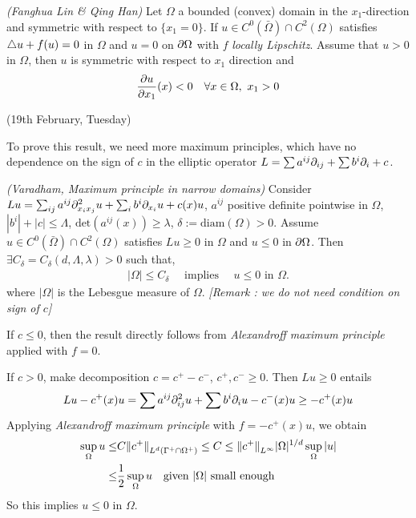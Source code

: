 \documentclass[12pt,a4paper]{article}
\newenvironment{proof}
{\begin{changemargin}{1cm}{0.5cm} 
	}%
	{\end{changemargin}
}
\newenvironment{p}
{\begin{proof} 
	}%
	{\end{proof}
}
\begin{document}
\lem \emph{(Fanghua Lin \& Qing Han)} Let $\Omega$ a bounded (convex) domain in the $x_1$-direction and symmetric with respect to $\{x_1 =0 \}$. If $u\in C^0(\bar{\Omega}) \cap C^2(\Omega)$ satisfies $\triangle u + f(u) =0$ in $\Omega$ and $u =0$ on $\partial \Omega$ with $f$ \emph{locally Lipschitz}. Assume that $u>0$ in $\Omega$, then $u$ is symmetric with respect to $x_1$ direction and
\begin{align*}
\frac{\partial u}{\partial x_1}(x) < 0 \quad \forall x\in \Omega, \,\, x_1>0
\end{align*}
\s

\newday

(19th February, Tuesday)
\s

To prove this result, we need more maximum principles, which have no dependence on the sign of $c$ in the elliptic operator $L = \sum a^{ij} \partial_{ij} + \sum b^i \partial_i + c$.
\s

\thm \emph{(Varadham, Maximum principle in narrow domains)} Consider $Lu = \sum_{ij}a^{ij} \partial^2_{x_i x_j} u + \sum_i b^i \partial_{x_i} u + c(x) u$, $a^{ij}$ positive definite pointwise in $\Omega$, $|b^i| + |c| \leq \Lambda$, $\text{det}(a^{ij}(x)) \geq \lambda$, $\delta := \text{diam}(\Omega)>0$. Assume $u \in C^0(\bar{\Omega}) \cap C^2(\Omega)$ satisfies $Lu \geq 0$ in $\Omega$ and $u\leq 0$ in $\partial \Omega$. Then $\exists C_{\delta} = C_{\delta}(d, \Lambda, \lambda) >0$ such that,
\begin{align*}
|\Omega|\leq C_{\delta} \quad \text{ implies } \quad u\leq 0\,\, \text{in } \Omega.
\end{align*}
where $|\Omega|$ is the Lebesgue measure of $\Omega$.
\emph{[Remark : we do not need condition on sign of $c$]}
\begin{p}
\pf If $c\leq 0$, then the result directly follows from \emph{Alexandroff maximum principle} applied with $f=0$.
\s

If $c>0$, make decomposition $c= c^+ - c^-$, $c^+, c^- \geq 0$. Then $Lu \geq 0$ entails
\begin{align*}
Lu - c^+(x)u = \sum a^{ij} \partial^2_{ij} u + \sum b^i \partial_i u - c^-(x) u  \geq -c^+(x) u
\end{align*}
Applying \emph{Alexandroff maximum principle} with $f= -c^+(x) u$, we obtain
\begin{align*}
\sup_{\Omega} u \leq & C \snorms{c^+ }{L^d (\Gamma^+ \cap \Omega^+)} \leq  C \leq \snorms{c^+}{L^{\infty}} |\Omega|^{1/d} \sup_{\Omega} |u| \\
\leq & \frac{1}{2} \sup_{\Omega} u \quad \text{given } |\Omega| \text{ small enough}
\end{align*}
So this implies $u\leq 0$ in $\Omega$.

\eop
\end{p}
\s
\end{document}
